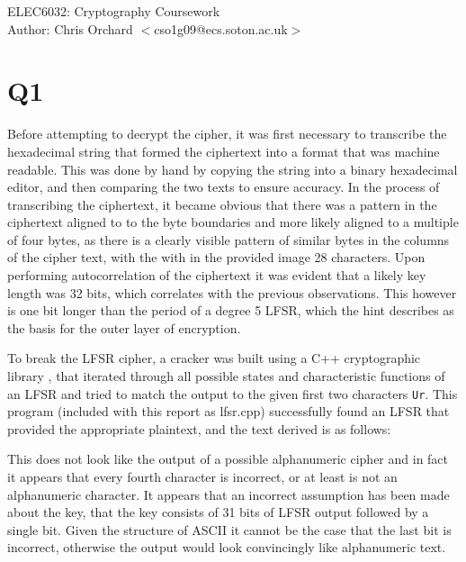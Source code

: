 \documentclass[pdflatex, a4paper,12pt]{article}
\begin{document}
\begin{center}
{\LARGE ELEC6032: Cryptography Coursework}\\[1em]

Author: Chris Orchard $<$cso1g09@ecs.soton.ac.uk$>$\\
\end{center}

\section{Q1}

Before attempting to decrypt the cipher, it was first necessary to transcribe
the hexadecimal string that formed the ciphertext into a format that was machine
readable. This was done by hand by copying the string into a binary hexadecimal
editor, and then comparing the two texts to ensure accuracy. In the process of
transcribing the ciphertext, it became obvious that there was a pattern in the
ciphertext aligned to to the byte boundaries and more likely aligned to a
multiple of four bytes, as there is a clearly visible pattern of similar bytes
in the columns of the cipher text, with the with in the provided image 28
characters. Upon performing autocorrelation of the ciphertext it was evident
that a likely key length was 32 bits, which correlates with the previous
observations. This however is one bit longer than the period of a degree 5 LFSR,
which the hint describes as the basis for the outer layer of encryption.

To break the LFSR cipher, a cracker was built using a C++ cryptographic library
\cite{_cryptographic-c---toolkit_????}, that iterated
through all possible states and characteristic functions of an LFSR and tried to
match the output to the given first two characters \verb+Ur+. This program
(included with this report as lfsr.cpp) successfully found an LFSR that provided
the appropriate plaintext, and the text derived is as follows:

\begin{quote}

\end{quote}

This does not look like the output of a possible alphanumeric cipher and in
fact it appears that every fourth character is incorrect, or at least is not an
alphanumeric character. It appears that an incorrect assumption has been made
about the key, that the key consists of 31 bits of LFSR output followed by a
single bit. Given the structure of ASCII it cannot be the case that the last bit
is incorrect, otherwise the output would look convincingly like alphanumeric text. 
\end{document}
